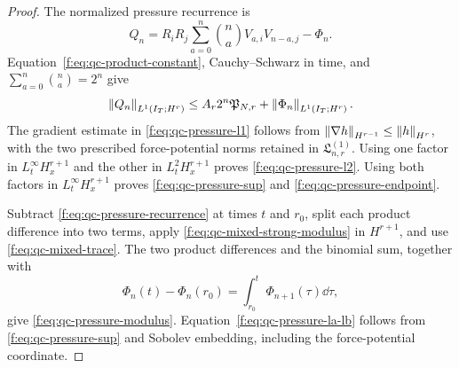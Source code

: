 \begin{proof}
The normalized pressure recurrence is
\begin{equation}
 Q_n=R_iR_j\sum_{a=0}^{n}\binom na V_{a,i}V_{n-a,j}-\Phi_n.
 \label{f:eq:qc-pressure-recurrence}
\end{equation}
Equation~\eqref{f:eq:qc-product-constant}, Cauchy--Schwarz in time, and
\(\sum_{a=0}^n\binom na=2^n\) give
\begin{equation}
 \left\lVert Q_n\right\rVert_{L^1(I_T;H^r)}
 \le A_r2^n\mathfrak P_{N,r}
 +\left\lVert \Phi_n\right\rVert_{L^1(I_T;H^r)}.
 \label{f:eq:qc-pressure-L1-sharp}
\end{equation}
The gradient estimate in \eqref{f:eq:qc-pressure-l1} follows from
\(\left\lVert \nabla h\right\rVert_{H^{r-1}}\le\left\lVert h\right\rVert_{H^r}\), with the two prescribed
force-potential norms retained in \(\mathfrak L^{(1)}_{n,r}\).
Using one factor in \(L_t^\infty H_x^{r+1}\) and the other in
\(L_t^2H_x^{r+1}\) proves \eqref{f:eq:qc-pressure-l2}.  Using both factors in
\(L_t^\infty H_x^{r+1}\) proves \eqref{f:eq:qc-pressure-sup} and
\eqref{f:eq:qc-pressure-endpoint}.

Subtract \eqref{f:eq:qc-pressure-recurrence} at times \(t\) and \(r_0\), split
each product difference into two terms, apply
\eqref{f:eq:qc-mixed-strong-modulus} in \(H^{r+1}\), and use
\eqref{f:eq:qc-mixed-trace}.  The two product differences and the binomial sum,
together with
\[
 \Phi_n(t)-\Phi_n(r_0)=\int_{r_0}^t\Phi_{n+1}(\tau)\dd\tau,
\]
give \eqref{f:eq:qc-pressure-modulus}.  Equation~\eqref{f:eq:qc-pressure-la-lb}
follows from \eqref{f:eq:qc-pressure-sup} and Sobolev embedding, including the
force-potential coordinate.
\end{proof}

